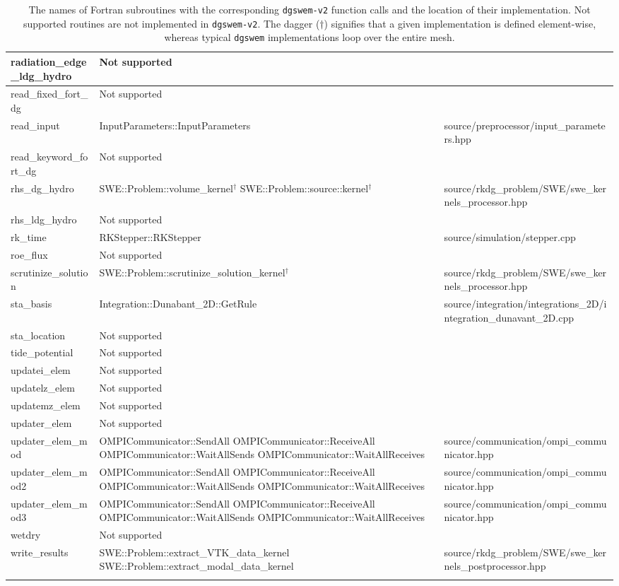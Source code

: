 {\begin{longtable}{ l | p{55mm} | p{86mm} }
\tabularnewline \hline
radiation\_edge\_ldg\_hydro & Not supported &	
\tabularnewline \hline
read\_fixed\_fort\_dg & Not supported &
\tabularnewline \hline
read\_input & InputParameters::InputParameters & source/preprocessor/input\_parameters.hpp
\tabularnewline \hline
read\_keyword\_fort\_dg & Not supported & 
\tabularnewline \hline
rhs\_dg\_hydro & SWE::Problem::volume\_kernel$^\dagger$ \newline SWE::Problem::source::kernel$^\dagger$ & source/rkdg_problem/SWE/swe\_kernels\_processor.hpp
\tabularnewline \hline
rhs\_ldg\_hydro & Not supported &	
\tabularnewline \hline
rk\_time	& RKStepper::RKStepper & source/simulation/stepper.cpp
\tabularnewline \hline
roe\_flux & Not supported &
\tabularnewline \hline
scrutinize\_solution & SWE::Problem::scrutinize\_solution\_kernel$^\dagger$ & source/rkdg_problem/SWE/swe\_kernels\_processor.hpp
\tabularnewline \hline
sta\_basis & Integration::Dunabant\_2D::GetRule & source/integration/integrations\_2D/integration\_dunavant\_2D.cpp
\tabularnewline \hline
sta\_location & Not supported &	
\tabularnewline \hline
tide\_potential	& Not supported &	
\tabularnewline \hline
updatei\_elem & Not supported &
\tabularnewline \hline
updatelz\_elem & Not supported &
\tabularnewline \hline
updatemz\_elem & Not supported &	
\tabularnewline \hline
updater\_elem & Not supported &	
\tabularnewline \hline
updater\_elem\_mod & OMPICommunicator::SendAll \newline OMPICommunicator::ReceiveAll \newline OMPICommunicator::WaitAllSends \newline OMPICommunicator::WaitAllReceives & source/communication/ompi\_communicator.hpp
\tabularnewline \hline
updater\_elem\_mod2 & OMPICommunicator::SendAll \newline OMPICommunicator::ReceiveAll \newline OMPICommunicator::WaitAllSends \newline OMPICommunicator::WaitAllReceives & source/communication/ompi\_communicator.hpp
\tabularnewline \hline
updater\_elem\_mod3 & OMPICommunicator::SendAll \newline OMPICommunicator::ReceiveAll \newline OMPICommunicator::WaitAllSends \newline OMPICommunicator::WaitAllReceives & source/communication/ompi\_communicator.hpp
\tabularnewline \hline
wetdry & Not supported	&
\tabularnewline \hline
write\_results & SWE::Problem::extract\_VTK\_data\_kernel \newline SWE::Problem::extract\_modal\_data\_kernel &	 source/rkdg_problem/SWE/swe\_kernels\_postprocessor.hpp
\tabularnewline \hline \hline
\caption{The names of Fortran subroutines with the corresponding \texttt{dgswem-v2} function calls and the location of their implementation. Not supported routines are not implemented in \texttt{dgswem-v2}. The dagger ($\dagger$) signifies that a given implementation is defined element-wise, whereas typical \texttt{dgswem} implementations loop over the entire mesh.}
\label{tab:dgswemtodgswemv2}
\end{longtable}
}
